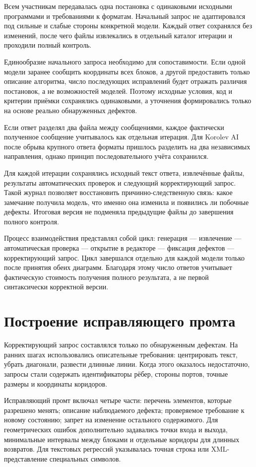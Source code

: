 \documentclass[a4paper,12pt]{extreport}
\begin{document}
Всем участникам передавалась одна постановка с одинаковыми исходными программами и требованиями к форматам. Начальный запрос не адаптировался под сильные и слабые стороны конкретной модели. Каждый ответ сохранялся без изменений, после чего файлы извлекались в отдельный каталог итерации и проходили полный контроль.

Единообразие начального запроса необходимо для сопоставимости. Если одной модели заранее сообщить координаты всех блоков, а другой предоставить только описание алгоритма, число последующих исправлений будет отражать различия постановок, а не возможностей моделей. Поэтому исходные условия, код и критерии приёмки сохранялись одинаковыми, а уточнения формировались только на основе реально обнаруженных дефектов.

Если ответ разделял два файла между сообщениями, каждое фактически полученное сообщение учитывалось как отдельная итерация. Для Korolev AI после обрыва крупного ответа форматы пришлось разделить на два независимых направления, однако принцип последовательного учёта сохранился.

Для каждой итерации сохранялись исходный текст ответа, извлечённые файлы, результаты автоматических проверок и следующий корректирующий запрос. Такой журнал позволяет восстановить причинно-следственную связь: какое замечание получила модель, что именно она изменила и появились ли побочные дефекты. Итоговая версия не подменяла предыдущие файлы до завершения полного контроля.

Процесс взаимодействия представлял собой цикл: генерация --- извлечение --- автоматическая проверка --- открытие в редакторе --- фиксация дефектов --- корректирующий запрос. Цикл завершался отдельно для каждой модели только после принятия обеих диаграмм. Благодаря этому число ответов учитывает фактическую стоимость получения полного результата, а не первой синтаксически корректной версии.

\section{Построение исправляющего промта}

Корректирующий запрос составлялся только по обнаруженным дефектам. На ранних шагах использовались описательные требования: центрировать текст, убрать диагонали, развести длинные линии. Когда этого оказалось недостаточно, запросы стали содержать идентификаторы рёбер, стороны портов, точные размеры и координаты коридоров.

Исправляющий промт включал четыре части: перечень элементов, которые разрешено менять; описание наблюдаемого дефекта; проверяемое требование к новому состоянию; запрет на изменение остального содержимого. Для геометрических ошибок дополнительно задавались точки входа и выхода, минимальные интервалы между блоками и отдельные коридоры для длинных возвратов. Для текстовых регрессий указывалась точная строка или XML-представление специальных символов.
\end{document}
